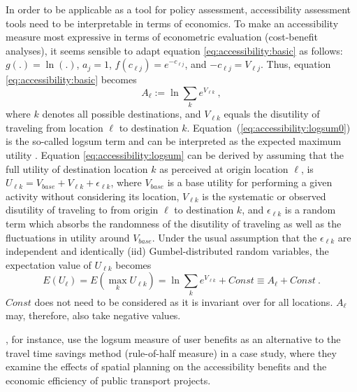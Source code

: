 In order to be applicable as a tool for policy assessment, accessibility assessment tools need to be interpretable in
terms of economics. To make an accessibility measure most expressive in terms of econometric evaluation (\eg cost-benefit 
analyses), it seems sensible to adapt equation \ref{eq:accessibility:basic} as 
follows: $g(.) = \ln(.)$, $a_j = 1$, $f(c_{\ell j}) = e^{-c_{\ell j}}$, and $-c_{\ell j} = V_{\ell j}$. Thus, 
equation \ref{eq:accessibility:basic} becomes
\begin{equation}
	A_\ell := \ln \sum_k e^{V_{\ell k}} \ ,
	\label{eq:accessibility:logsum}
\end{equation}
where $k$ denotes all possible destinations, and $V_{\ell k}$ equals the disutility of traveling from location $\ell$
to destination $k$. Equation~(\ref{eq:accessibility:logsum0}) is the so-called \gls{logsum} term and can be interpreted
as the expected maximum utility \citep[e.g.,][]{Ben-AkivaBook, DejongEtc2005LogsumAsEvalDutchReport}. Equation
\ref{eq:accessibility:logsum} can be derived by assuming that the full utility of destination location $k$ as
perceived at origin location $\ell$, is $U_{\ell k} = V_{base} + V_{\ell k} + \epsilon_{\ell k}$,
where $V_{base}$ is a base utility for performing a given activity without considering its location,
$V_{\ell k}$ is the systematic or observed disutility of traveling to from origin $\ell$ to destination $k$,
and $\epsilon_{\ell k}$ is a random term which absorbs the randomness of the disutility of traveling as well as
the fluctuations in utility around $V_{base}$. Under the usual assumption that the $\epsilon_{\ell k}$ are
independent and identically (iid) Gumbel-distributed random variables, the expectation value of $U_{\ell k}$ becomes
\begin{equation}
	E(U_\ell) = E(\max_k U_{\ell k}) = \ln \sum_k e^{V_{\ell k}} + Const \equiv A_\ell + Const \ .
\end{equation}
$Const$ does not need to be considered as it is invariant over for all locations. $A_\ell$ may, therefore, also
take negative values.

\citet{GeursEtAl2012AccessibilityBenefitsNetherlands}, for instance, use the \gls{logsum} measure of user benefits 
as an alternative to the travel time savings method (\ie rule-of-half measure) in a case study, where they 
examine the effects of spatial planning on the accessibility benefits and the economic efficiency of public 
transport projects.

